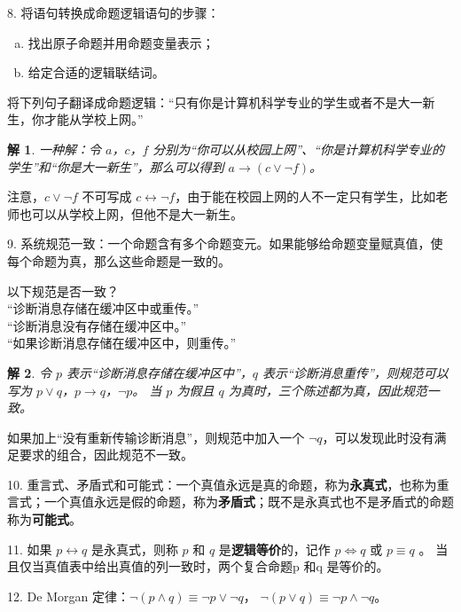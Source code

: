 \documentclass[normal,cyan]{elegantnote}
\newtheorem{solve}{解}
\begin{document}
8. 将语句转换成命题逻辑语句的步骤：
\begin{enumerate}[a)]
    \item 找出原子命题并用命题变量表示；
    \item 给定合适的逻辑联结词。
\end{enumerate}

\begin{example}
    将下列句子翻译成命题逻辑：“只有你是计算机科学专业的学生或者不是大一新生，你才能从学校上网。”
\end{example}
\begin{solve}一种解：令 $a$，$c$，$f$ 分别为“你可以从校园上网”、“你是计算机科学专业的学生”和“你是大一新生”，那么可以得到 $a \to \left(c \vee \neg f\right)$。\end{solve}
\begin{remark}
    注意，$c \vee \neg f$ 不可写成 $c \leftrightarrow \neg f$，由于能在校园上网的人不一定只有学生，比如老师也可以从学校上网，但他不是大一新生。
\end{remark}

9. 系统规范一致：一个命题含有多个命题变元。如果能够给命题变量赋真值，使每个命题为真，那么这些命题是一致的。
\begin{example}
    以下规范是否一致？\\
“诊断消息存储在缓冲区中或重传。”\\
“诊断消息没有存储在缓冲区中。”\\
“如果诊断消息存储在缓冲区中，则重传。”
\end{example}
\begin{solve}令 $p$ 表示“诊断消息存储在缓冲区中”，$q$ 表示“诊断消息重传”，则规范可以写为 $p \vee q$，$p \to q$，$\neg p$。
当 $p$ 为假且 $q$ 为真时，三个陈述都为真，因此规范一致。\end{solve}
\begin{note}
    如果加上“没有重新传输诊断消息”，则规范中加入一个 $\neg q$，可以发现此时没有满足要求的组合，因此规范不一致。
\end{note}

10. 重言式、矛盾式和可能式：一个真值永远是真的命题，称为\textbf{永真式}，也称为重言式；一个真值永远是假的命题，称为\textbf{矛盾式}；既不是永真式也不是矛盾式的命题称为\textbf{可能式}。

11. 如果 $p\leftrightarrow q$ 是永真式，则称 $p$ 和 $q$ 是\textbf{逻辑等价}的，记作 $p\Longleftrightarrow q$ 或 $p\equiv q$ 。
当且仅当真值表中给出真值的列一致时，两个复合命题p 和q 是等价的。

12. De Morgan 定律：$\neg\left(p\wedge q\right)\equiv \neg p \vee \neg q$， $\neg\left(p \vee q\right) \equiv \neg p \wedge \neg q$。
\end{document}
